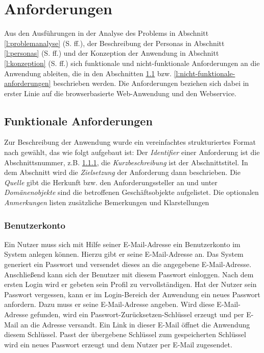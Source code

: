\section{Anforderungen}\label{l:anforderungen}

Aus den Ausführungen in der Analyse des Problems in Abschnitt \ref{l:problemanalyse} (S.\pageref{l:problemanalyse} ff.), der Beschreibung der Personas in Abschnitt \ref{l:personas} (S.\pageref{l:personas} ff.) und der Konzeption der Anwendung in Abschnitt \ref{l:konzeption} (S.\pageref{l:konzeption} ff.) sich funktionale und nicht-funktionale Anforderungen an die Anwendung ableiten, die in den Abschnitten \ref{l:funktionale-anforderungen} bzw. \ref{l:nicht-funktionale-anforderungen} beschrieben werden. Die Anforderungen beziehen sich dabei in erster Linie auf die browserbasierte Web-Anwendung und den Webservice. 

\subsection{Funktionale Anforderungen}\label{l:funktionale-anforderungen}

Zur Beschreibung der Anwendung wurde ein vereinfachtes strukturiertes Format nach \cite[S.151 ff.]{schienmann2002kontinuierliches} gewählt, das wie folgt aufgebaut ist: Der \emph{Identifier} einer Anforderung ist die Abschnittsnummer, z.B. \ref{anforderung:registrierung},  die \emph{Kurzbeschreibung} ist der Abschnittstitel. In dem Abschnitt wird die \emph{Zielsetzung} der Anforderung dann beschrieben. Die \emph{Quelle} gibt die Herkunft bzw. den Anforderungssteller an und unter \emph{Domänenobjekte} sind die betroffenen Geschäftsobjekte aufgelistet. Die optionalen \emph{Anmerkungen} listen zusätzliche Bemerkungen und Klarstellungen

\subsubsection{Benutzerkonto}\label{anforderung:registrierung}

Ein Nutzer muss sich mit Hilfe seiner E-Mail-Adresse ein Benutzerkonto im System anlegen können. Hierzu gibt er seine E-Mail-Adresse an. Das System generiert ein Passwort und versendet dieses an die angegebene E-Mail-Adresse. Anschließend kann sich der Benutzer mit diesem Passwort einloggen. Nach dem ersten Login wird er gebeten sein Profil zu vervollständigen. Hat der Nutzer sein Passwort vergessen, kann er im Login-Bereich der Anwendung ein neues Passwort anfordern. Dazu muss er seine E-Mail-Adresse angeben. Wird diese E-Mail-Adresse gefunden, wird ein Passwort-Zurücksetzen-Schlüssel erzeugt und per E-Mail an die Adresse versandt. Ein Link in dieser E-Mail öffnet die Anwendung diesem Schlüssel. Passt der übergebene Schlüssel zum gespeicherten Schlüssel wird ein neues Passwort erzeugt und dem Nutzer per E-Mail zugesendet.

